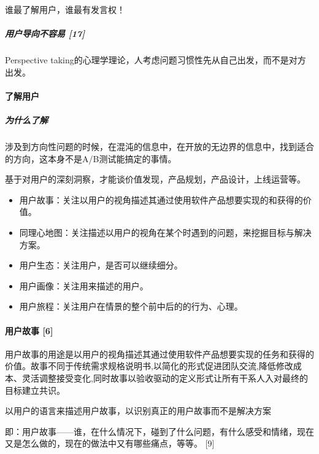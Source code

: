 \documentclass[letterpaper,10pt,english]{sphinxmanual}
\begin{document}
谁最了解用户，谁最有发言权！


\subparagraph{用户导向不容易 {[}17{]}}
\label{\detokenize{chapter_knowledge/users_analysis:id6}}
Perspective
taking的心理学理论，人考虑问题习惯性先从自己出发，而不是对方出发。


\paragraph{了解用户}
\label{\detokenize{chapter_knowledge/users_analysis:id7}}

\subparagraph{为什么了解}
\label{\detokenize{chapter_knowledge/users_analysis:id8}}
涉及到方向性问题的时候，在混沌的信息中，在开放的无边界的信息中，找到适合的方向，这本身不是A/B测试能搞定的事情。

基于对用户的深刻洞察，才能谈价值发现，产品规划，产品设计，上线运营等。

\begin{itemize}
\item {} 
用户故事：关注以用户的视角描述其通过使用软件产品想要实现的和获得的价值。

\item {} 
同理心地图：关注描述以用户的视角在某个时遇到的问题，来挖掘目标与解决方案。

\item {} 
用户生态：关注用户，是否可以继续细分。

\item {} 
用户画像：关注用来描述的用户。

\item {} 
用户旅程：关注用户在情景的整个前中后的的行为、心理。

\end{itemize}


\paragraph{用户故事 {[}6{]}}
\label{\detokenize{chapter_knowledge/users_analysis:id9}}
用户故事的用途是以用户的视角描述其通过使用软件产品想要实现的任务和获得的价值。故事不同于传统需求规格说明书,以简化的形式促进团队交流,降低修改成本、灵活调整接受变化,同时故事以验收驱动的定义形式让所有干系人入对最终的目标建立共识。

以用户的语言来描述用户故事，以识别真正的用户故事而不是解决方案

即：用户故事——谁，在什么情况下，碰到了什么问题，有什么感受和情绪，现在又是怎么做的，现在的做法中又有哪些痛点，等等。
{[}9{]}
\end{document}
